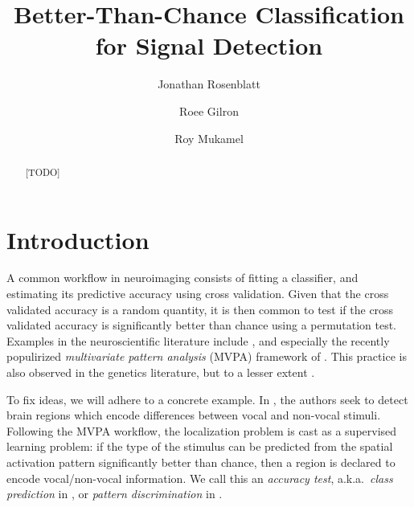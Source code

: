 \documentclass[12pt,a4paper]{article}
\author{Jonathan Rosenblatt \and Roee Gilron \and Roy Mukamel}
\title{Better-Than-Chance Classification for Signal Detection}
\begin{document}


\maketitle
\linenumbers

\begin{abstract}
[TODO]
\end{abstract}


\section{Introduction}
\label{sec:introduction}

A common workflow in neuroimaging consists of fitting a classifier, and estimating its predictive accuracy using cross validation. 
Given that the cross validated accuracy is a random quantity, it is then common to test if the cross validated accuracy is significantly better than chance using a permutation test.  
Examples in the neuroscientific literature include \citet{golland_permutation_2003,pereira_machine_2009,varoquaux_assessing_2016}, and especially the recently populirized \emph{multivariate pattern analysis} (MVPA) framework of \citet{kriegeskorte_information-based_2006}.
This practice is also observed in the genetics literature, but to a lesser extent \citep{radmacher_paradigm_2002,jiang_calculating_2008}.

To fix ideas, we will adhere to a concrete example.
In \cite{gilron_quantifying_2016}, the authors seek to detect brain regions which encode differences between vocal and non-vocal stimuli. 
Following the MVPA workflow, the localization problem is cast as a supervised learning problem: if the type of the stimulus can be predicted from the spatial activation pattern significantly better than chance, then a region is declared to encode vocal/non-vocal information. 
We call this an \emph{accuracy test}, a.k.a.\ \emph{class prediction} in \cite{simon_pitfalls_2003}, or \emph{pattern discrimination} in \cite{pereira_machine_2009}.
\end{document}
